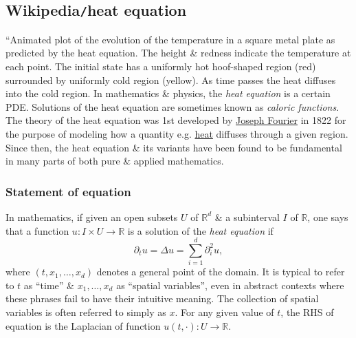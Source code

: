 \documentclass{article}
\begin{document}

\subsection{Wikipedia{\tt/}heat equation}
``{\sf Animated plot of the evolution of the temperature in a square metal plate as predicted by the heat equation. The height \& redness indicate the temperature at each point. The initial state has a uniformly hot hoof-shaped region (red) surrounded by uniformly cold region (yellow). As time passes the heat diffuses into the cold region.} In mathematics \& physics, the {\it heat equation} is a certain PDE. Solutions of the heat equation are sometimes known as {\it caloric functions}. The theory of the heat equation was 1st developed by \href{https://en.wikipedia.org/wiki/Joseph_Fourier}{\sc Joseph Fourier} in 1822 for the purpose of modeling how a quantity e.g. \href{https://en.wikipedia.org/wiki/Heat}{heat} diffuses through a given region. Since then, the heat equation \& its variants have been found to be fundamental in many parts of both pure \& applied mathematics.

\subsubsection{Statement of equation}
In mathematics, if given an open subsets $U$ of $\mathbb{R}^d$ \& a subinterval $I$ of $\mathbb{R}$, one says that a function $u:I\times U\to\mathbb{R}$ is a solution of the {\it heat equation} if
\begin{equation}
	\label{heat}
	\partial_tu = \Delta u = \sum_{i=1}^d \partial_i^2u,
\end{equation}
where $(t,x_1,\ldots,x_d)$ denotes a general point of the domain. It is typical to refer to $t$ as ``time'' \& $x_1,\ldots,x_d$ as ``spatial variables'', even in abstract contexts where these phrases fail to have their intuitive meaning. The collection of spatial variables is often referred to simply as $x$. For any given value of $t$, the RHS of equation is the Laplacian of function $u(t,\cdot):U\to\mathbb{R}$.
\end{document}
